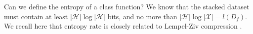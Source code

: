 \documentclass[11pt]{amsart}
\newcommand{\inputspace}{\mathcal X}
\newcommand{\handspace}{\mathcal H}
\begin{document}
Can we define the entropy of a class function?  
%
% 
% 
 We know that the stacked dataset must contain at least $|\handspace| \log |\handspace|$ bits, and no more than  $|\handspace| \log |\inputspace| = l(D_{f})$.
 We recall here that entropy rate is closely related to Lempel-Ziv  compression \cite{Cover:2006aa}. 
 
\end{document}
